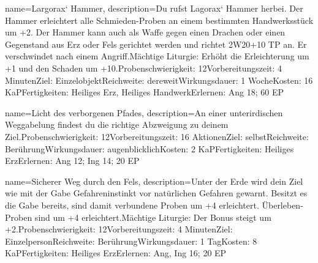 {
    name={Largorax‘ Hammer},
    description={Du rufst Lagorax‘ Hammer herbei. Der Hammer erleichtert alle Schmieden-Proben an einem bestimmten Handwerksstück um +2. Der Hammer kann auch als Waffe gegen einen Drachen oder einen Gegenstand aus Erz oder Fels gerichtet werden und richtet 2W20+10 TP an. Er verschwindet nach einem Angriff.\newline Mächtige Liturgie: Erhöht die Erleichterung um +1 und den Schaden um +10.\newline Probenschwierigkeit: 12\newline Vorbereitungszeit: 4 Minuten\newline Ziel: Einzelobjekt\newline Reichweite: dereweit\newline Wirkungsdauer: 1 Woche\newline Kosten: 16 KaP\newline Fertigkeiten: Heiliges Erz, Heiliges Handwerk\newline Erlernen: Ang 18; 60 EP}
}


{
    name={Licht des verborgenen Pfades},
    description={An einer unterirdischen Weggabelung findest du die richtige Abzweigung zu deinem Ziel.\newline Probenschwierigkeit: 12\newline Vorbereitungszeit: 16 Aktionen\newline Ziel: selbst\newline Reichweite: Berührung\newline Wirkungsdauer: augenblicklich\newline Kosten: 2 KaP\newline Fertigkeiten: Heiliges Erz\newline Erlernen: Ang 12; Ing 14; 20 EP}
}


{
    name={Sicherer Weg durch den Fels},
    description={Unter der Erde wird dein Ziel wie mit der Gabe Gefahreninstinkt vor natürlichen Gefahren gewarnt. Besitzt es die Gabe bereits, sind damit verbundene Proben um +4 erleichtert. Überleben-Proben sind um +4 erleichtert.\newline Mächtige Liturgie: Der Bonus steigt um +2.\newline Probenschwierigkeit: 12\newline Vorbereitungszeit: 4 Minuten\newline Ziel: Einzelperson\newline Reichweite: Berührung\newline Wirkungsdauer: 1 Tag\newline Kosten: 8 KaP\newline Fertigkeiten: Heiliges Erz\newline Erlernen: Ang, Ing 16; 20 EP}
}


